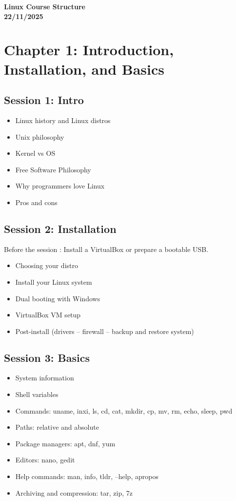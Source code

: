 \documentclass[12pt]{article}
\begin{document}
\begin{center}
\headingfont\Huge\bfseries\color{navy}
Linux Course Structure\\[0.5em]
\Large\color{teamred}
22/11/2025
\end{center}




\section*{Chapter 1: Introduction, Installation, and Basics}

\subsection*{Session 1: Intro}
\begin{itemize}
    \item Linux history and Linux distros
    \item Unix philosophy
    \item Kernel vs OS
    \item Free Software Philosophy
    \item Why programmers love Linux
    \item Pros and cons
\end{itemize}

\subsection*{Session 2: Installation}
\begin{warningbox}
Before the session : Install a VirtualBox or prepare a bootable USB.
\end{warningbox}

\begin{itemize}
    \item Choosing your distro
    \item Install your Linux system
    \item Dual booting with Windows
    \item VirtualBox VM setup
    \item Post-install (drivers – firewall – backup and restore system)
\end{itemize}

\subsection*{Session 3: Basics}
\begin{itemize}
    \item System information
    \item Shell variables
    \item Commands: uname, inxi, ls, cd, cat, mkdir, cp, mv, rm, echo, sleep, pwd
    \item Paths: relative and absolute
    \item Package managers: apt, dnf, yum
    \item Editors: nano, gedit
    \item Help commands: man, info, tldr, --help, apropos
    \item Archiving and compression: tar, zip, 7z
\end{itemize}
\end{document}
